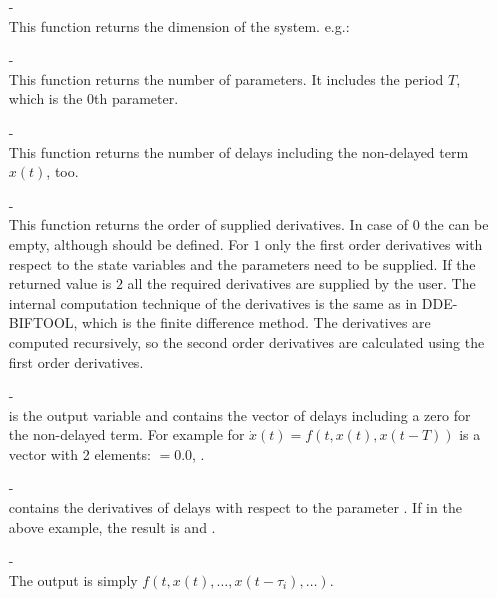 \documentclass[10pt,a4paper]{ddedoc}
\begin{document}
\begin{itemize}
  \item[-]  \\ 
  This function returns the dimension of the
  system. e.g.: 
  
  \item[-]  \\ 
  This function returns the number of parameters. It
  includes the period $T$, which is the 0th parameter.
  
  \item[-]  \\ 
  This function returns the number of delays including the non-delayed term $x (
t )$, too.
  
  \item[-]  \\ 
  This function returns the order of supplied derivatives. In case of $0$ the
 can be empty, although should be defined. For $1$ only the
first order derivatives with respect to the state variables and the parameters
need to be supplied. If the returned value is $2$ all the required derivatives
are supplied by the user. The internal computation technique of the derivatives
is the same as in DDE-BIFTOOL, which is the finite difference method. The
derivatives are computed recursively, so the second order derivatives are
calculated using the first order derivatives.
  
  \item[-] 
\\
   is the output variable and contains the vector of delays
  including a zero for the non-delayed term. For example for $\dot{x} ( t ) =
  f ( t, x ( t ), x ( t - T ) )$  is a vector with 2 elements:
  $=0.0$, .
  
  \item[-]  \\
   contains the derivatives of delays with respect to the parameter
  . If  in the above example, the result is
   and .
  
  \item[-]  \\ 
  The output  is simply $f ( t, x ( t ), \ldots, x ( t - \tau_i ),
\ldots )$.
  

\end{itemize}
\end{document}
